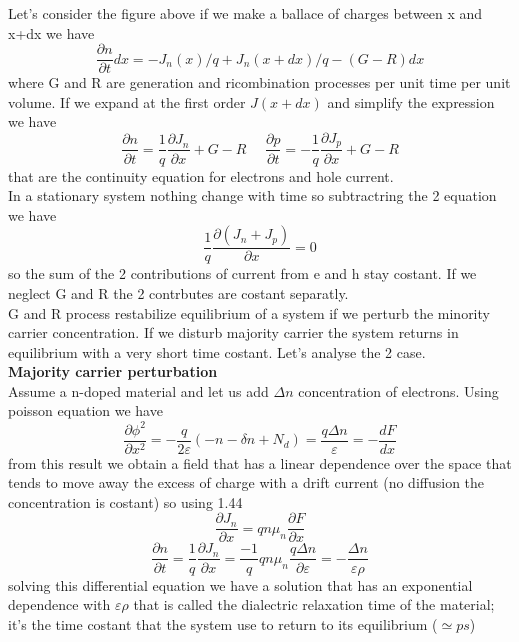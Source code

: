 Let's consider the figure above if we make a ballace of charges between x and x+dx we have 
\begin{equation}
\frac{\partial n}{\partial t}dx=-J_n(x)/q+J_n(x+dx)/q-(G-R)dx
\end{equation}
where G and R are generation and ricombination processes per unit time per unit volume. If we expand at the first order $J(x+dx)$ and simplify the expression we have
\begin{equation}
\frac{\partial n}{\partial t}=\frac{1}{q}\frac{\partial J_n}{\partial x}+G-R \ \ \ \ \ \ \frac{\partial p}{\partial t}=-\frac{1}{q}\frac{\partial J_p}{\partial x}+G-R
\end{equation}
that are the continuity equation for electrons and hole current.\\
In a stationary system nothing change with time so subtractring the 2 equation we have 
\begin{equation}
\frac{1}{q}\frac{\partial(J_n+J_p)}{\partial x}=0
\end{equation}
so the sum of the 2 contributions of current from e and h stay costant. If we neglect G and R the 2 contrbutes are costant separatly.\\
G and R process restabilize equilibrium of a system if we perturb the minority carrier concentration. If we disturb majority carrier the system returns in equilibrium with a very short time costant.
Let's analyse the 2 case.\\ 

{\bf Majority carrier perturbation}\\
Assume a n-doped material and let us add $\Delta n$ concentration of electrons. Using poisson equation we have
\begin{equation}
\frac{\partial \phi^2}{\partial x^2}=-\frac{q}{2\varepsilon}\left(-n-\delta n + N_d\right)=\frac{q\Delta n}{\varepsilon}=-\frac{dF}{dx} 
\end{equation}
from this result we obtain a field that has a linear dependence over the space that tends to move away the excess of charge with a drift current (no diffusion the concentration is costant) so using  1.44
\begin{equation}
\frac{\partial J_n}{\partial x}=qn\mu_n\frac{\partial F}{\partial x}
\end{equation}
\begin{equation}
\frac{\partial n}{\partial t}=\frac{1}{q}\frac{\partial J_n}{\partial x}=\frac{-1}{q}qn\mu_n\frac{q\Delta n}{\partial \varepsilon}=-\frac{\Delta n}{\varepsilon \rho}
\end{equation}
solving this differential equation we have a solution that has an exponential dependence with $\varepsilon \rho$ that is called the dialectric relaxation time of the material; it's the time costant that the system use to return to its equilibrium ($\simeq ps$)\\

